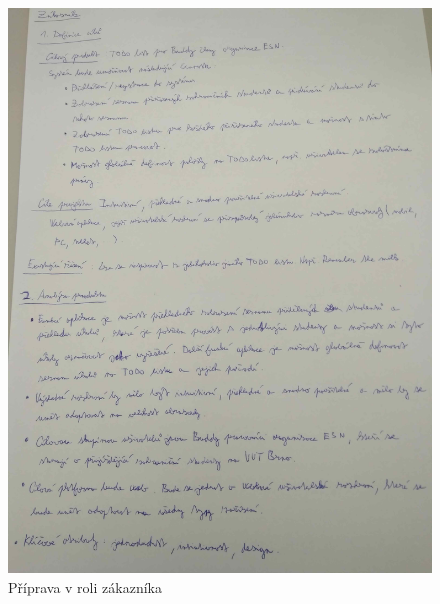 \documentclass[a4paper, 11pt]{article}
\begin{document}
	\begin{figure}[ht]
		\centering
		\includegraphics[width=0.98\linewidth]{priprava_v_roli_zakaznika_1.jpg}
		\caption{Příprava v roli zákazníka}
	\end{figure}
\end{document}
